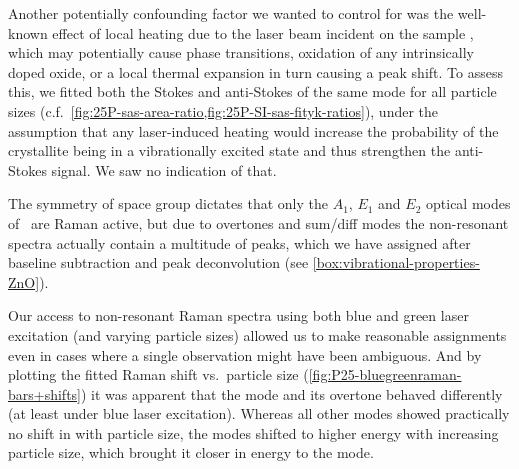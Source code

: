 \documentclass[webedition,openright,titles,swedish,english]{LuaUUThesis}\usepackage[]{graphicx}\usepackage[]{xcolor}
\newcommand{\cf}{c.f.}
\newcommand{\vs}{vs.}
\begin{document}
Another potentially confounding factor we wanted to control for was the well-known
effect of local heating due to the laser beam incident on the sample \cite{Thyr2023},
which may potentially cause phase transitions, oxidation of any intrinsically doped oxide,
or a local thermal expansion in turn causing a peak shift.
To assess this, we fitted both the Stokes and anti-Stokes of the same mode for
all particle sizes (\cf\ \cref{fig:25P-sas-area-ratio,fig:25P-SI-sas-fityk-ratios}),
under the assumption that any laser-induced heating would increase the probability
of the crystallite being in a vibrationally excited state and thus strengthen the
anti-Stokes signal. We saw no indication of that.

The symmetry of space group  dictates that only the
$A_1$, $E_1$ and $E_2$ optical modes of \ZnO\ are Raman active, but
due to overtones and sum/diff modes the non-resonant spectra
actually contain a multitude of peaks, which we have assigned after baseline
subtraction and peak deconvolution
(see \cref{box:vibrational-properties-ZnO}).

Our access to non-resonant Raman spectra using both blue and green laser excitation
(and varying particle sizes)
allowed us to make reasonable assignments even in cases where a single observation
might have been ambiguous.
And by plotting the fitted Raman shift \vs\ particle size (\cref{fig:P25-bluegreenraman-bars+shifts})
it was apparent that the  mode and its overtone behaved differently
(at least under blue laser excitation).
Whereas all other modes showed practically no shift in  with
particle size, the  modes shifted to higher energy with increasing
particle size, which brought it closer in energy to the  mode.


\clearpage
%
\end{document}
